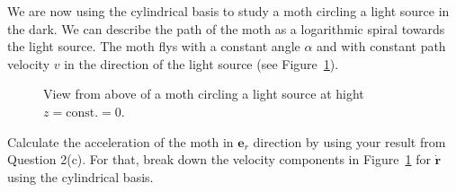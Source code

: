 \documentclass[10pt]{article}
\newcommand{\noin}{\noindent}
\begin{document}
\pagebreak

\noin{\bf 3.} We are now using the cylindrical basis to study a moth circling a light source in the
dark. We can describe the path of the moth as a logarithmic spiral towards the light source. The
moth flys with a constant angle $\alpha$ and with constant path velocity $v$ in the direction of the
light source (see Figure~\ref{pic:moth}).

  \begin{figure}[H]
    \begin{center}
    \end{center}
    \caption{View from above of a moth circling a light source at hight $z = \text{const.} = 0$.}
    \label{pic:moth}
  \end{figure}
\medskip

\noin{(a)} Calculate the acceleration of the moth in $\mathbf{e}_r$ direction by using your result
from Question 2(c). For that, break down the velocity components in Figure~\ref{pic:moth} for
$\mathbf{\dot r}$ using the cylindrical basis.


    
\end{document}
